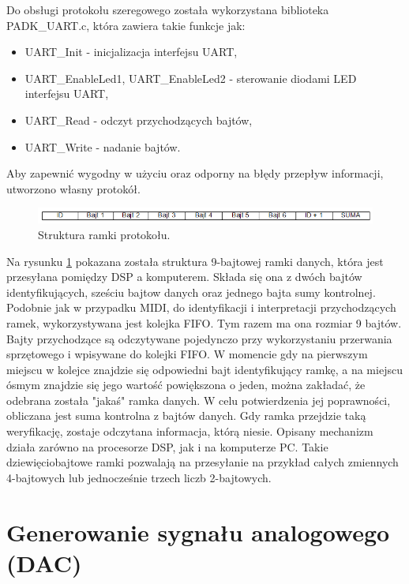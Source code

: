 Do obsługi protokołu szeregowego została wykorzystana biblioteka PADK\_UART.c, która zawiera takie funkcje jak:
\begin{itemize}
	\item UART\_Init - inicjalizacja interfejsu UART,
	\item UART\_EnableLed1, UART\_EnableLed2 - sterowanie diodami LED interfejsu UART,
	\item UART\_Read - odczyt przychodzących bajtów,
	\item UART\_Write - nadanie bajtów.
\end{itemize}
Aby zapewnić wygodny w użyciu oraz odporny na błędy przepływ informacji, utworzono własny protokół.
\begin{figure}[H]
	\centering
	\includegraphics[width=16cm]{./grafiki/real_uartframe}
	\captionsetup{justification=centering}
	\caption{Struktura ramki protokołu.}
	\label{rys:real_uartframe}
\end{figure}
Na rysunku \ref{rys:real_uartframe} pokazana została struktura 9-bajtowej ramki danych, która jest przesyłana pomiędzy DSP a komputerem. Składa się ona z dwóch bajtów identyfikujących, sześciu bajtow danych oraz jednego bajta sumy kontrolnej. Podobnie jak w przypadku MIDI, do identyfikacji i interpretacji przychodzących ramek, wykorzystywana jest kolejka FIFO. Tym razem ma ona rozmiar 9 bajtów. Bajty przychodzące są odczytywane pojedynczo przy wykorzystaniu przerwania sprzętowego i wpisywane do kolejki FIFO. W momencie gdy na pierwszym miejscu w kolejce znajdzie się odpowiedni bajt identyfikujący ramkę, a na miejscu ósmym znajdzie się jego wartość powiększona o jeden, można zakładać, że odebrana została "jakaś" ramka danych. W celu potwierdzenia jej poprawności, obliczana jest suma kontrolna z bajtów danych. Gdy ramka przejdzie taką weryfikację, zostaje odczytana informacja, którą niesie. Opisany mechanizm działa zarówno na procesorze DSP, jak i na komputerze PC.
Takie dziewięciobajtowe ramki pozwalają na przesyłanie na przykład całych zmiennych 4-bajtowych lub jednocześnie trzech liczb 2-bajtowych. 



\section{Generowanie sygnału analogowego (DAC)}

